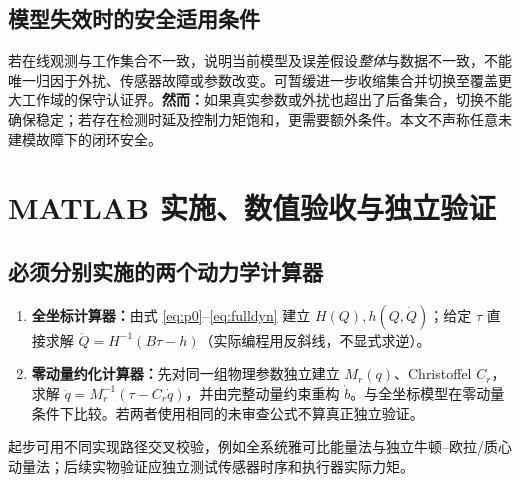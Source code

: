 \documentclass[journal,onecolumn]{IEEEtran}
\begin{document}
\subsection{模型失效时的安全适用条件}
若在线观测与工作集合不一致，说明当前模型及误差假设\emph{整体}与数据不一致，不能唯一归因于外扰、传感器故障或参数改变。可暂缓进一步收缩集合并切换至覆盖更大工作域的保守认证界。\textbf{然而：}如果真实参数或外扰也超出了后备集合，切换不能确保稳定；若存在检测时延及控制力矩饱和，更需要额外条件。本文不声称任意未建模故障下的闭环安全。

\section{MATLAB 实施、数值验收与独立验证}
\subsection{必须分别实施的两个动力学计算器}
\begin{enumerate}[leftmargin=2em]
\item \textbf{全坐标计算器：}由式 \eqref{eq:p0}--\eqref{eq:fulldyn} 建立 $H(Q),h(Q,\dot Q)$；给定 $\tau$ 直接求解 $\ddot Q=H^{-1}(B\tau-h)$（实际编程用反斜线，不显式求逆）。
\item \textbf{零动量约化计算器：}先对同一组物理参数独立建立 $M_r(q)$、Christoffel $C_r$，求解 $\ddot q=M_r^{-1}(\tau-C_r\dot q)$，并由完整动量约束重构 $\dot b$。与全坐标模型在零动量条件下比较。若两者使用相同的未审查公式不算真正独立验证。
\end{enumerate}
起步可用不同实现路径交叉校验，例如全系统雅可比能量法与独立牛顿--欧拉/质心动量法；后续实物验证应独立测试传感器时序和执行器实际力矩。
\end{document}
